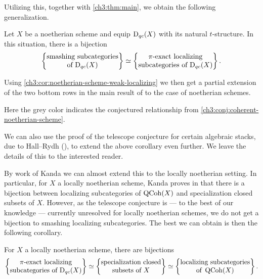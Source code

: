 Utilizing this, together with \cref{ch3:thm:main}, we obtain the following generalization. 

\begin{corollary}
    Let $X$ be a noetherian scheme and equip $\mathrm{D}_{qc}(X)$ with its natural $t$-structure. In this situation, there is a bijection
    \[\left\{ \begin{matrix} \text{smashing subcategories}\\ \text{of }\mathrm{D}_{qc}(X) \end{matrix} \right\} \simeq \left\{ \begin{matrix} \pi\text{-exact localizing}\\ \text{subcategories of }\mathrm{D}_{qc}(X) \end{matrix} \right\}.\]
\end{corollary}

Using \cref{ch3:cor:noetherian-scheme-weak-localizing} we then get a partial extension of the two bottom rows in the main result of \cite{takahashi_2009} to the case of noetherian schemes.  

\begin{center}
\end{center}

Here the grey color indicates the conjectured relationship from \cref{ch3:conj:coherent-noetherian-scheme}. 

We can also use the proof of the telescope conjecture for certain algebraic stacks, due to Hall--Rydh (\cite{hall-rydh_2017}), to extend the above corollary even further. We leave the details of this to the interested reader. 

By work of Kanda we can almost extend this to the locally noetherian setting. In particular, for $X$ a locally noetherian scheme, Kanda proves in \cite[1.4]{kanda_2015} that there is a bijection between localizing subcategories of $\operatorname{QCoh}(X)$ and specialization closed subsets of $X$. However, as the telescope conjecture is --- to the best of our knowledge --- currently unresolved for locally noetherian schemes, we do not get a bijection to smashing localizing subcategories. The best we can obtain is then the following corollary. 

\begin{corollary}
    For $X$ a locally noetherian scheme, there are bijections
    \[\left\{ \begin{matrix} \pi\text{-exact localizing}\\ \text{subcategories of }\mathrm{D}_{qc}(X) \end{matrix} \right\}\simeq \left\{ \begin{matrix} \text{specialization closed}\\ \text{subsets of }X \end{matrix} \right\} \simeq \left\{ \begin{matrix} \text{localizing subcategories}\\ \text{of }\operatorname{QCoh}(X) \end{matrix} \right\}.\]
\end{corollary}

